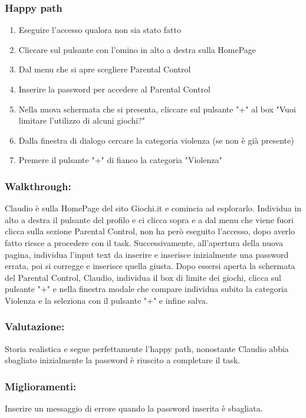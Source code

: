 \documentclass[../Report.tex]{subfiles}
\begin{document}
    \subsubsection{Happy path}
    \begin{enumerate}
        \item Eseguire l'accesso qualora non sia stato fatto 
        \item Cliccare sul pulsante con l’omino in alto a destra sulla HomePage
        \item Dal menu che si apre scegliere Parental Control
        \item Inserire la password per accedere al Parental Control        \item Nella nuova schermata che si presenta, cliccare sul pulsante "+" al box "Vuoi limitare l'utilizzo di alcuni giochi?"
        \item Dalla finestra di dialogo cercare la categoria violenza (se non è già presente)
        \item Premere il pulsante "+" di fianco la categoria "Violenza"
    \end{enumerate}

    \subsubsection{Walkthrough:}
    Claudio è sulla HomePage del sito Giochi.it e comincia ad esplorarlo. Individua in alto a destra il pulsante del profilo e ci clicca sopra e a dal menu che viene fuori clicca sulla sezione Parental Control, non ha però eseguito l'accesso, dopo averlo fatto riesce a procedere con il task. Successivamente, all'apertura della nuova pagina, individua l'input text da inserire e inserisce inizialmente una password errata, poi si corregge e inserisce quella giusta. Dopo essersi aperta la schermata del Parental Control, Claudio, individua il box di limite dei giochi, clicca sul pulsante "+" e nella finestra modale che compare individua subito la categoria Violenza e la seleziona con il pulsante "+" e infine salva.  
    \subsubsection{Valutazione:}
    Storia realistica e segue perfettamente l’happy path, nonostante Claudio abbia sbagliato inizialmente la password è riuscito a completare il task. 

    \subsubsection{Miglioramenti:}
    Inserire un messaggio di errore quando la password inserita è sbagliata.
\end{document}
